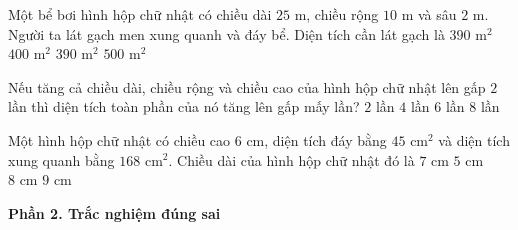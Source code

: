\begin{ex} %
Một bể bơi hình hộp chữ nhật có chiều dài $25\text{ m}$, chiều rộng $10\text{ m}$ và sâu $2\text{ m}$. Người ta lát gạch men xung quanh và đáy bể. Diện tích cần lát gạch là
\choice
{$390\text{ m}^2$}
{$400\text{ m}^2$}
{\True $390\text{ m}^2$}
{$500\text{ m}^2$}
\end{ex}

\begin{ex} %
Nếu tăng cả chiều dài, chiều rộng và chiều cao của hình hộp chữ nhật lên gấp $2$ lần thì diện tích toàn phần của nó tăng lên gấp mấy lần?
\choice
{$2$ lần}
{\True $4$ lần}
{$6$ lần}
{$8$ lần}
\end{ex}

\begin{ex} %
Một hình hộp chữ nhật có chiều cao $6\text{ cm}$, diện tích đáy bằng $45\text{ cm}^2$ và diện tích xung quanh bằng $168\text{ cm}^2$. Chiều dài của hình hộp chữ nhật đó là
\choice
{$7\text{ cm}$}
{$5\text{ cm}$}
{$8\text{ cm}$}
{\True $9\text{ cm}$}
\end{ex}

\textbf{Phần 2. Trắc nghiệm đúng sai}

